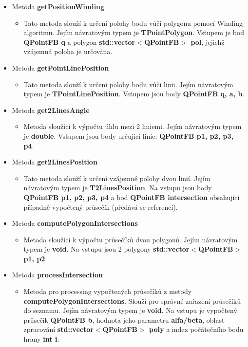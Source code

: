 \documentclass[a4paper, 12pt]{article}
\begin{document}
\begin{itemize}
	\item Metoda \textbf{getPositionWinding}
		\begin{itemize}
			\item Tato metoda slouží k určení polohy bodu vůči polygonu pomocí Winding algoritmu. Jejím návratovým typem je \textbf{TPointPolygon}. Vstupem je bod \textbf{QPointFB q} a polygon \textbf{std::vector$<$QPointFB$>$ pol}, jejichž vzájemná poloha je určována.
		\end{itemize}
	\item Metoda \textbf{getPointLinePosition}
		\begin{itemize}
			\item Tato metoda slouží k určení polohy bodu vůči linii. Jejím návratovým typem je \textbf{TPointLinePosition}. Vstupem jsou body \textbf{QPointFB q, a, b}.
		\end{itemize}
	\item Metoda \textbf{get2LinesAngle}
		\begin{itemize}
			\item Metoda sloužící k výpočtu úhlu mezi 2 liniemi. Jejím návratovým typem je \textbf{double}. Vstupem jsou body určující linie: \textbf{QPointFB p1, p2, p3, p4}.
		\end{itemize}
	\item Metoda \textbf{get2LinesPosition}
		\begin{itemize}
			\item Tato metoda slouží k určení vzájemné polohy dvou linií. Jejím návratovým typem je \textbf{T2LinesPosition}. Na vstupu jsou body \textbf{QPointFB p1, p2, p3, p4} a bod \textbf{QPointFB intersection} obsahující případně vypočtený průsečík (předává se referencí). 
		\end{itemize}
	\item Metoda \textbf{computePolygonIntersections}
		\begin{itemize}
			\item Metoda sloužící k výpočtu průsečíků dvou polygonů. Jejím návratovým typem je \textbf{void}. Na vstupu jsou 2 polygony \textbf{std::vector$<$QPointFB$>$ p1, p2}.
		\end{itemize}
	\item Metoda \textbf{processIntersection}
		\begin{itemize}
			\item Metoda pro processing vypočtených průsečíků z metody \textbf{computePolygonIntersections}. Slouží pro správné zařazení průsečíků do seznamu. Jejím návratovým typem je \textbf{void}. Na vstupu je vypočtený průsečík \textbf{QPointFB b}, hodnota jeho parametru \textbf{alfa/beta}, oblast zpracování \textbf{std::vector$<$QPointFB$>$ poly} a index počátečního bodu hrany \textbf{int i}.

\end{itemize}
\end{itemize}
\end{document}
